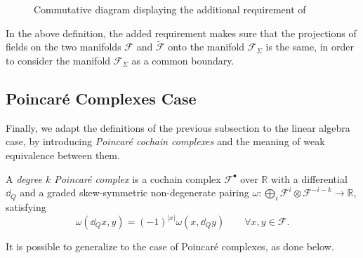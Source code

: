 \begin{figure}
    \centering
    
    \caption{Commutative diagram displaying the additional requirement of }
    \label{fig:weak_equiv}
\end{figure}

In the above definition, the added requirement makes sure that the projections of fields on the two manifolds $\mathcal{F}$ and $\widetilde{\mathcal{F}}$ onto the manifold $\mathcal{F}_\Sigma$ is the same, in order to consider the manifold $\mathcal{F}_\Sigma$ as a common boundary.

\subsection{Poincaré Complexes Case}
\label{subsec:Poincaré_complex_case}

Finally, we adapt the definitions of the previous subsection to the linear algebra case, by introducing \emph{Poincaré cochain complexes} and the meaning of weak equivalence between them.

\begin{definition}
    A \emph{degree $k$ Poincaré complex} is a cochain complex $\mathcal{F}^\bullet$ over $\mathbb{R}$ with a differential $\dd_Q$ and a graded skew-symmetric non-degenerate pairing $\omega : \bigoplus_i \mathcal{F}^i \otimes \mathcal{F}^{-i-k} \rightarrow \mathbb{R}$, satisfying
    \begin{equation*}
        \omega(\dd_Q x, y) = (-1)^{|x|} \omega (x, \dd_Q y) \qquad \forall x, y \in \mathcal{F} .
    \end{equation*}
\end{definition}

It is possible to generalize  to the case of Poincaré complexes, as done below.

